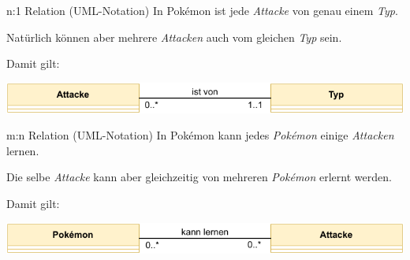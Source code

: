 \begin{example}{n:1 Relation (UML-Notation)}
    In Pokémon ist jede \emph{Attacke} von genau einem \emph{Typ}.

    Natürlich können aber mehrere \emph{Attacken} auch vom gleichen \emph{Typ} sein.

    Damit gilt:
    \begin{center}
        \includegraphics[width=0.7\linewidth]{includes/figures/example_entity_relationship_modell_uml_many_to_one.pdf}
    \end{center}
\end{example}

\begin{example}{m:n Relation (UML-Notation)}
    In Pokémon kann jedes \emph{Pokémon} einige \emph{Attacken} lernen.

    Die selbe \emph{Attacke} kann aber gleichzeitig von mehreren \emph{Pokémon} erlernt werden.

    Damit gilt:
    \begin{center}
        \includegraphics[width=0.7\linewidth]{includes/figures/example_entity_relationship_modell_uml_many_to_many.pdf}
    \end{center}
\end{example}
